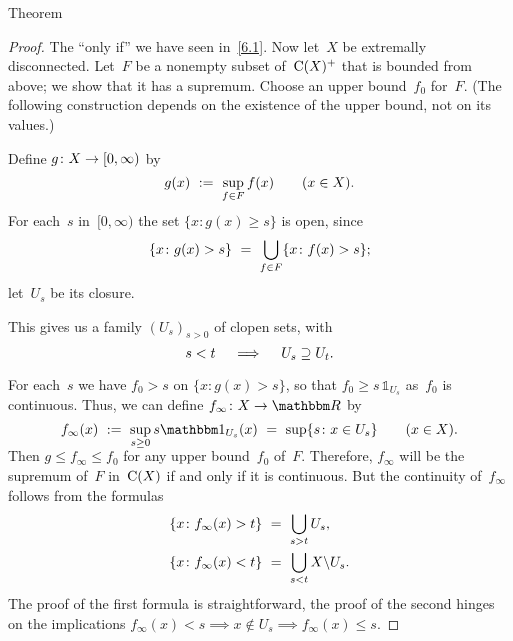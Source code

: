 \documentclass[main.tex]{subfiles}
\begin{document}
%
%
\begin{psec}{6.5}{Theorem}\end{psec}
\begin{proof}
The ``only if'' we have seen in~\ref{6.1}.
Now let~$X$ be extremally disconnected.
Let~$F$ be a nonempty subset of~$\mathrm{C}(X)^+$
that is bounded from above;
we show that it has a supremum.
Choose an upper bound~$f_0$ for~$F$.
(The following construction depends on the existence
of the upper bound, not on its values.)

Define $g\colon X\rightarrow [0,\infty)$ by
\begin{equation*}
g(x)\ :=\ \sup_{f\in F} f(x)\qquad(x\in X)\text{.}
\end{equation*}
For each~$s$ in~$[0,\infty)$
the set $\{x\colon g(x)\geq s\}$ is open, since
\begin{equation*}
\{x\colon g(x)>s\}\ =\ \bigcup_{f\in F} \{x\colon f(x)>s\}\htam{;}
\end{equation*}
let~$U_s$ be its closure.

This gives us a family $(U_s)_{s>0}$ of clopen sets, with
\begin{equation*}
s<t\quad\implies\quad U_s \supseteq U_t\text{.}
\end{equation*}

For each~$s$ we have $f_0 > s$ on $\{x\colon g(x)>s\}$,
so that $f_0\geq s\,\mathbb{1}_{U_s}$
as~$f_0$ is continuous.
Thus, we can define $f_\infty\colon X\ra \R$ by
\begin{equation*}
f_\infty(x)\ 
:=\ \smash{\sup_{s\geq 0}}\, s\mathbb{1}_{U_s}(x)\ 
=\ \sup\{s\colon x\in U_s\}
\qquad(x\in X)\htam{.}
\end{equation*}
Then $g\leq f_\infty\leq f_0$ for any upper bound~$f_0$ of~$F$.
Therefore, $f_\infty$ will be the supremum of~$F$ in~$\mathrm{C}(X)$
if and only if it is continuous.
But the continuity of~$f_\infty$ follows from the formulas
\begin{align*}
\{ x\colon f_\infty(x)>t\}\ &=\ \bigcup_{s>t} U_s\text{,}\\
\{ x\colon f_\infty(x)<t\}\ &=\ \bigcup_{s<t} X\backslash U_s\text{.}
\end{align*}
The proof of the first formula is straightforward,
the proof of the second hinges on the implications
$f_\infty(x)<s\implies x\notin U_s \implies f_\infty(x)\leq s$. \xqed
\end{proof}
%
\end{document}

